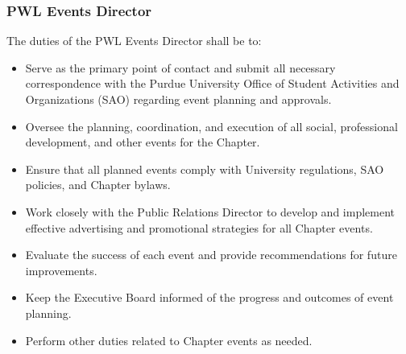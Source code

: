 \documentclass[10pt, oneside]{article}
\begin{document}
\subsubsection{PWL Events Director}
The duties of the PWL Events Director shall be to:
\begin{itemize}
    \item Serve as the primary point of contact and submit all necessary correspondence with the Purdue University Office of Student Activities and Organizations (SAO) regarding event planning and approvals.
    \item Oversee the planning, coordination, and execution of all social, professional development, and other events for the Chapter.
    \item Ensure that all planned events comply with University regulations, SAO policies, and Chapter bylaws.
    \item Work closely with the Public Relations Director to develop and implement effective advertising and promotional strategies for all Chapter events.
    \item Evaluate the success of each event and provide recommendations for future improvements.
    \item Keep the Executive Board informed of the progress and outcomes of event planning.
    \item Perform other duties related to Chapter events as needed.
\end{itemize}
\end{document}
